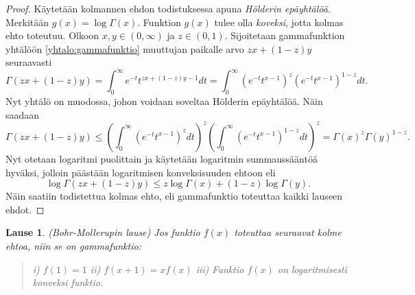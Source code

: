 \documentclass[12pt]{article}
\theoremstyle{definition}
\theoremstyle{plain}
\newtheorem{lause}{Lause}
\numberwithin{equation}{section}
\begin{document}
\begin{proof}
Käytetään kolmannen ehdon todistuksessa apuna \emph{Hölderin epäyhtälöä}. Merkitään $g(x) = \log\Gamma(x)$. Funktion $g(x)$ tulee olla \emph{koveksi}, jotta kolmas ehto toteutuu.\newline
Olkoon $x,y\in(0,\infty)$ ja $z\in(0,1)$. Sijoitetaan gammafunktion yhtälöön \eqref{yhtalo:gammafunktio} muuttujan paikalle arvo $zx+(1-z)y$ seuraavasti
\begin{equation*}
    \Gamma(zx+(1-z)y)=\int_{0}^{\infty}e^{-t}t^{zx+(1-z)y-1}dt = \int_{0}^{\infty}(e^{-t}t^{x-1})^{z}(e^{-t}t^{x-1})^{1-z}dt.
\end{equation*}
Nyt yhtälö on muodossa, johon voidaan soveltaa Hölderin epäyhtälöä. Näin saadaan
\begin{equation*}
    \Gamma(zx+(1-z)y)\le \left( \int_{0}^{\infty}(e^{-t}t^{x-1})^{z}dt\right)^{z}\left(\int_{0}^{\infty}(e^{-t}t^{x-1})^{1-z}dt \right)^{z}=\Gamma(x)^{z}\Gamma(y)^{1-z}.
\end{equation*}
Nyt otetaan logaritmi puolittain ja käytetään logaritmin summaussääntöä hyväksi, jolloin päästään logaritmisen konveksisuuden ehtoon eli
\begin{equation*}
    \log\Gamma(zx+(1-z)y)\le z\log\Gamma(x)+(1-z)\log\Gamma(y).
\end{equation*}
Näin saatiin todistettua kolmas ehto, eli gammafunktio toteuttaa kaikki lauseen ehdot. \newline
\end{proof}

\begin{lause}
(Bohr-Mollerupin lause)
\newline
Jos funktio $f(x)$ toteuttaa seuraavat kolme ehtoa, niin se on gammafunktio:
\begin{quote}
i) $f(1)=1$ \newline
ii) $f(x+1)=xf(x)$ \newline
iii) Funktio $f(x)$ on logaritmisesti konveksi funktio.
\end{quote}
\end{lause}
\end{document}
